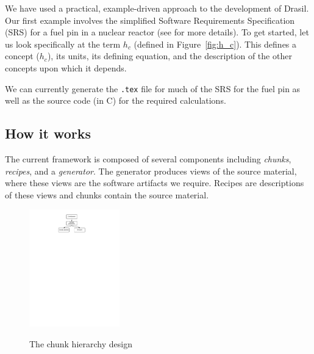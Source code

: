 \documentclass{sig-alternate-05-2015}
\newcommand{\lss}{Drasil}
\begin{document}
We have used a practical, example-driven approach to the development of \lss{}.
Our first example involves 
the simplified Software Requirements Specification (SRS) for a fuel pin in a
nuclear reactor (see \cite{SmithAndKoothoor2016} for more details). To get
started, let us look specifically at the term $h_c$ (defined in
Figure~\ref{fig:h_c}).  This defines a concept ($h_c$), its units, its
defining equation, and the description of the other concepts upon which it
depends.

We can currently generate the \verb|.tex| file for
much of the SRS for the fuel pin as well as the source code (in C) for the
required calculations.

\subsection{How it works} \label{sssec:ex_how}

The current framework is composed of several components including
\textit{chunks}, \textit{recipes}, and a \textit{generator}. The generator
produces views of the source material, where these views are the software
artifacts we require. Recipes are descriptions of these views and chunks contain
the source material.


\begin{figure}
\begin{center}
{
 \includegraphics[width=0.35\textwidth]{ChunkHierarchy.pdf}
}
\end{center}
\caption{The chunk hierarchy design}
\label{fig:chunks}
\end{figure}
\end{document}
